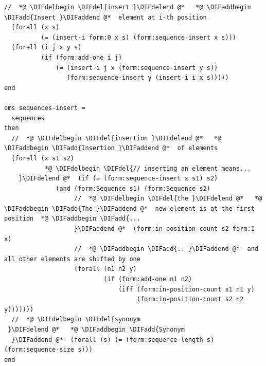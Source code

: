 \documentclass[10pt,fleqn,final]{scrreprt}
\providecommand{\DIFadd}[1]{{\protect\color{blue}\uwave{#1}}} %
\providecommand{\DIFdel}[1]{{\protect\color{red}\sout{#1}}}                      %
\providecommand{\DIFaddbegin}{} %
\providecommand{\DIFaddend}{} %
\providecommand{\DIFdelbegin}{} %
\providecommand{\DIFdelend}{} %
\begin{document}
\begin{lstlisting}[language=clif,morekeywords={then,with,logic,oms,end},mathescape]
  //  *@ \DIFdelbegin \DIFdel{insert }\DIFdelend @*   *@ \DIFaddbegin \DIFadd{Insert }\DIFaddend @*  element at i-th position
  (forall (x s)
          (= (insert-i form:0 x s) (form:sequence-insert x s)))
  (forall (i j x y s)
          (if (form:add-one i j)
              (= (insert-i j x (form:sequence-insert y s))
                 (form:sequence-insert y (insert-i i x s)))))
end

oms sequences-insert =
  sequences
then
  //  *@ \DIFdelbegin \DIFdel{insertion }\DIFdelend @*   *@ \DIFaddbegin \DIFadd{Insertion }\DIFaddend @*  of elements
  (forall (x s1 s2)
           *@ \DIFdelbegin \DIFdel{// inserting an element means...
    }\DIFdelend @*  (if (= (form:sequence-insert x s1) s2)
              (and (form:Sequence s1) (form:Sequence s2)
                   //  *@ \DIFdelbegin \DIFdel{the }\DIFdelend @*   *@ \DIFaddbegin \DIFadd{The }\DIFaddend @*  new element is at the first position  *@ \DIFaddbegin \DIFadd{...
                   }\DIFaddend @*  (form:in-position-count s2 form:1 x)
                   //  *@ \DIFaddbegin \DIFadd{.. }\DIFaddend @*  and all other elements are shifted by one
                   (forall (n1 n2 y)
                           (if (form:add-one n1 n2)
                               (iff (form:in-position-count s1 n1 y)
                                    (form:in-position-count s2 n2 y)))))))
  //  *@ \DIFdelbegin \DIFdel{synonym
 }\DIFdelend @*   *@ \DIFaddbegin \DIFadd{Synonym
  }\DIFaddend @*  (forall (s) (= (form:sequence-length s) (form:sequence-size s)))
end


\end{lstlisting}
\end{document}

